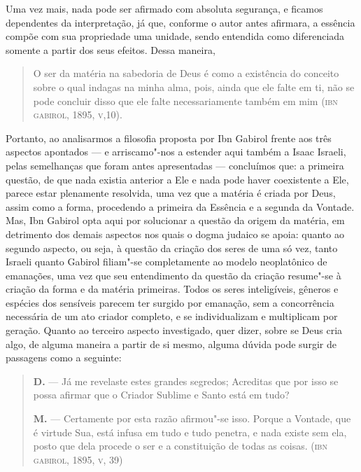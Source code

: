 Uma vez mais, nada pode ser afirmado com absoluta segurança, e ficamos
dependentes da interpretação, já que, conforme o autor antes
afirmara, a essência compõe com sua propriedade uma unidade, sendo
entendida como diferenciada somente a partir dos seus efeitos. Dessa
maneira, 

\begin{quote}
O ser da matéria na sabedoria de Deus é como a existência do conceito
sobre o qual indagas na minha alma, pois, ainda que ele falte em ti,
não se pode concluir disso que ele falte necessariamente também em
mim (\textsc{ibn} \textsc{gabirol}, 1895, \textsc{v},10).
\end{quote}

Portanto, ao analisarmos a filosofia proposta por Ibn Gabirol frente
aos três aspectos apontados --- e arriscamo"-nos a estender aqui também
a Isaac Israeli, pelas semelhanças que foram antes apresentadas ---
concluímos que: a primeira questão, de que nada existia anterior a
Ele e nada pode haver coexistente a Ele, parece estar plenamente
resolvida, uma vez que a matéria é criada por Deus, assim como a
forma, procedendo a primeira da Essência e a segunda da Vontade. Mas,
Ibn Gabirol opta aqui por solucionar a questão da origem da matéria,
em detrimento dos demais aspectos nos quais o dogma judaico se apoia:
quanto ao segundo aspecto, ou seja, à questão da criação dos seres de
uma só vez, tanto Israeli quanto Gabirol filiam"-se completamente ao
modelo neoplatônico de emanações, uma vez que seu entendimento da
questão da criação resume"-se à criação da forma e da matéria
primeiras. Todos os seres inteligíveis, gêneros e espécies dos
sensíveis parecem ter surgido por emanação, sem a concorrência
necessária de um ato criador completo, e se individualizam e
multiplicam por geração. Quanto ao terceiro aspecto investigado, quer
dizer, sobre se Deus cria algo, de alguma maneira a partir de si
mesmo, alguma dúvida pode surgir de passagens como a seguinte:

\begin{quote}
\textbf{D.} --- Já me revelaste estes grandes segredos; Acreditas que
por isso se possa afirmar que o Criador Sublime e Santo está em tudo?

\textbf{M.} --- Certamente por esta razão afirmou"-se isso. Porque a
Vontade, que é virtude Sua, está infusa em tudo e tudo penetra, e
nada existe sem ela, posto que dela procede o ser  e a constituição
de todas as coisas. (\textsc{ibn} \textsc{gabirol}, 1895, \textsc{v}, 39)
\end{quote}

